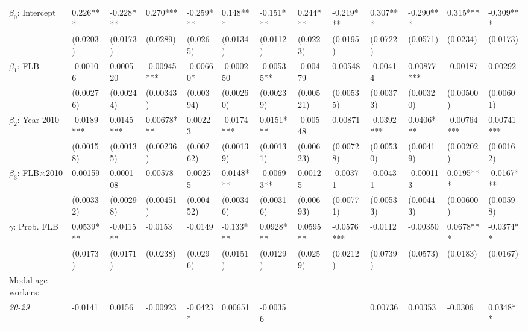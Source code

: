 \documentclass[Review,times,sageh,11pt]{sagej}
\begin{document}
\begin{sidewaystable}[htb]
{\begin{threeparttable}
\begin{tabular}{l*{12}{l}}
\midrule
$\beta_0$: Intercept             &       0.226***    & -0.228***   & 0.270***     & -0.259***  & 0.148***   & -0.151***   & 0.244***    & -0.219***  & 0.307***   & -0.290***  & 0.315***     & -0.309***  \\
                                &       (0.0203)    & (0.0173)    & (0.0289)     & (0.0265)   & (0.0134)   & (0.0112)    & (0.0223)    & (0.0195)   & (0.0722)   & (0.0571)   & (0.0234)     & (0.0173)   \\[1ex]
$\beta_1$: FLB                  &       -0.00106    & 0.000520    & -0.00945***  & -0.00660*  & -0.000250  & -0.00535**  & -0.00479    & 0.00548    & -0.00414   & 0.00877*** & -0.00187     & 0.00292    \\
                                &       (0.00276)   & (0.00244)   & (0.00343)    & (0.00394)  & (0.00260)  & (0.00239)   & (0.00521)   & (0.00535)  & (0.00373)  & (0.00320)  & (0.00500)    & (0.00601)  \\[1ex]
$\beta_2$: Year 2010            &       -0.0189***  & 0.0145***   & 0.00678***   & 0.00223    & -0.0174*** & 0.0151***   & -0.00548    & 0.00871    & -0.0392*** & 0.0406***  & -0.00764***  & 0.00741*** \\
                                &       (0.00158)   & (0.00135)   & (0.00236)    & (0.00262)  & (0.00139)  & (0.00131)   & (0.00623)   & (0.00728)  & (0.00530)  & (0.00419)  & (0.00202)    & (0.00162)  \\[1ex]
$\beta_3$: FLB$\times$2010      &       0.00159     & 0.000108    & 0.00578      & 0.00255    & 0.0148***  & -0.00693**  & 0.00125     & -0.00371   & -0.00431   & -0.000113  & 0.0195***    & -0.0167*** \\
                                &       (0.00332)   & (0.00298)   & (0.00451)    & (0.00452)  & (0.00346)  & (0.00316)   & (0.00693)   & (0.00771)  & (0.00533)  & (0.00443)  & (0.00600)    & (0.00598)  \\[1ex]
$\gamma$: Prob. FLB              &       0.0539***   & -0.0415**   & -0.0153      & -0.0149    & -0.133***  & 0.0928***   & 0.0595**    & -0.0576*** & -0.0112    & -0.00350   & 0.0678***    & -0.0374**  \\
                                &       (0.0173)    & (0.0171)    & (0.0238)     & (0.0296)   & (0.0151)   & (0.0129)    & (0.0259)    & (0.0212)   & (0.0739)   & (0.0573)   & (0.0183)     & (0.0167)   \\[1ex]
\cmidrule(lr){1-13}
Modal age workers:             \\[1ex]
\quad \textit{20-29}            &       -0.0141     & 0.0156      & -0.00923     & -0.0423*   & 0.00651    & -0.00356    &             &            & 0.00736    & 0.00353    & -0.0306      & 0.0348**   \\

\end{tabular}
\end{threeparttable}}
\end{sidewaystable}
\end{document}
